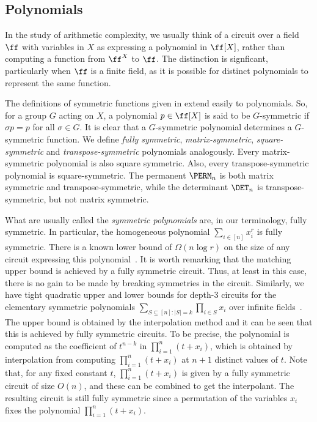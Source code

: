 \documentclass{toc}
\begin{document}
\subsection{Polynomials}\label{sec:polynomials}
In the study of arithmetic complexity, we usually think of a circuit over a
field $\ff$ with variables in $X$ as expressing a polynomial in $\ff[X]$, rather
than computing a function from $\ff^X$ to $\ff$. The distinction is signficant,
particularly when $\ff$ is a finite field, as it is possible for distinct
polynomials to represent the same function.

The definitions of symmetric functions given in
 extend easily to polynomials. So, for a
group $G$ acting on $X$, a polynomial $p \in \ff[X]$ is said to be $G$-symmetric
if $\sigma p = p$ for all $\sigma \in G$.   It is clear that a $G$-symmetric polynomial
determines a $G$-symmetric function.  We define \emph{fully symmetric},
\emph{matrix-symmetric}, \emph{square-symmetric} and \emph{transpose-symmetric}
polynomials analogously. Every matrix-symmetric polynomial is also square
symmetric. Also, every transpose-symmetric polynomial is square-symmetric. The
permanent $\PERM_n$ is both matrix symmetric and transpose-symmetric, while the
determinant $\DET_n$ is transpose-symmetric, but not matrix symmetric.

What are usually called the \emph{symmetric polynomials} are, in our
terminology, fully symmetric. In particular, the homogeneous polynomial $\sum_{i
  \in [n]}x_i^r$ is fully symmetric. There is a known lower bound of $\Omega(n
\log r)$ on the size of any circuit expressing this polynomial~\cite{BaurS83}.
It is worth remarking that the matching upper bound is achieved by a fully symmetric
circuit. Thus, at least in this case, there is no gain to be made by breaking
symmetries in the circuit.  Similarly, we have tight quadratic upper and lower
bounds for depth-3 circuits for the elementary symmetric polynomials $\sum_{S \subseteq [n] : |S|=k}\prod_{i\in
  S}x_i$ over infinite fields~\cite{ShpilkaW01}.  The upper
bound is obtained  by the interpolation method and it can be seen that this is achieved by
fully symmetric circuits.  To be precise, the polynomial is computed
as the coefficient of $t^{n-k}$ in $\prod_{i=1}^n (t+x_i)$, which is
obtained by interpolation from computing $\prod_{i=1}^n (t+x_i)$ at
$n+1$ distinct values of $t$.  Note that, for any fixed constant $t$,
$\prod_{i=1}^n (t+x_i)$ is given by a fully symmetric circuit of size
$O(n)$, and these can be combined to get the interpolant.  The
resulting circuit is still fully symmetric since a permutation of the
variables $x_i$ fixes the polynomial $\prod_{i=1}^n (t+x_i)$.
\end{document}
